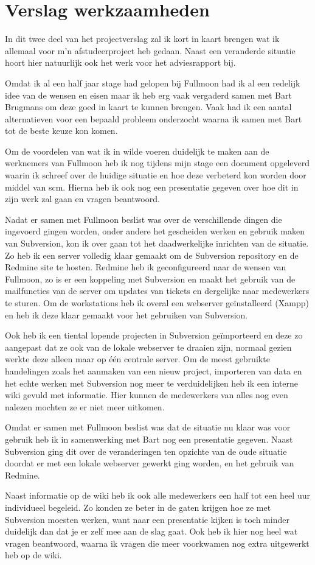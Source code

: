 \chapter{Verslag werkzaamheden}

In dit twee deel van het projectverslag zal ik kort in kaart brengen wat ik allemaal voor m'n afstudeerproject heb gedaan. Naast een veranderde situatie hoort hier natuurlijk ook het werk voor het adviesrapport bij. 

Omdat ik al een half jaar stage had gelopen bij Fullmoon had ik al een redelijk idee van de wensen en eisen maar ik heb erg vaak vergaderd samen met Bart Brugmans om deze goed in kaart te kunnen brengen. Vaak had ik een aantal alternatieven voor een bepaald probleem onderzocht waarna ik samen met Bart tot de beste keuze kon komen.

Om de voordelen van wat ik in wilde voeren duidelijk te maken aan de werknemers van Fullmoon heb ik nog tijdens mijn stage een document opgeleverd waarin ik schreef over de huidige situatie en hoe deze verbeterd kon worden door middel van {\sc scm}. Hierna heb ik ook nog een presentatie gegeven over hoe dit in zijn werk zal gaan en vragen beantwoord.

Nadat er samen met Fullmoon beslist was over de verschillende dingen die ingevoerd gingen worden, onder andere het gescheiden werken en gebruik maken van Subversion, kon ik over gaan tot het daadwerkelijke inrichten van de situatie. Zo heb ik een server volledig klaar gemaakt om de Subversion repository en de Redmine site te hosten. Redmine heb ik geconfigureerd naar de wensen van Fullmoon, zo is er een koppeling met Subversion en maakt het gebruik van de mailfuncties van de server om updates van tickets en dergelijke naar medewerkers te sturen. Om de workstations heb ik overal een webserver geïnstalleerd (Xampp) en heb ik deze klaar gemaakt voor het gebruiken van Subversion.

Ook heb ik een tiental lopende projecten in Subversion geïmporteerd en deze zo aangepast dat ze ook van de lokale webserver te draaien zijn, normaal gezien werkte deze alleen maar op één centrale server. Om de meest gebruikte handelingen zoals het aanmaken van een nieuw project, importeren van data en het echte werken met Subversion nog meer te verduidelijken heb ik een interne wiki gevuld met informatie. Hier kunnen de medewerkers van alles nog even nalezen mochten ze er niet meer uitkomen.

Omdat er samen met Fullmoon beslist was dat de situatie nu klaar was voor gebruik heb ik in samenwerking met Bart nog een presentatie gegeven. Naast Subversion ging dit over de veranderingen ten opzichte van de oude situatie doordat er met een lokale webserver gewerkt ging worden, en het gebruik van Redmine.

Naast informatie op de wiki heb ik ook alle medewerkers een half tot een heel uur individueel begeleid. Zo konden ze beter in de gaten krijgen hoe ze met Subversion moesten werken, want naar een presentatie kijken is toch minder duidelijk dan dat je er zelf mee aan de slag gaat. Ook heb ik hier nog heel wat vragen beantwoord, waarna ik vragen die meer voorkwamen nog extra uitgewerkt heb op de wiki.